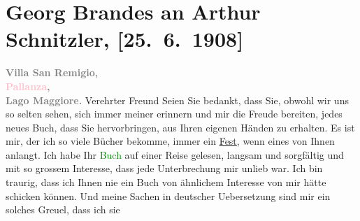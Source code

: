 

               \section[Georg Brandes an Arthur Schnitzler, {[}25. 6. 1908{]}]{ Georg Brandes an Arthur Schnitzler, {[}25. 6. 1908{]}}\nopagebreak{}\rehead{ }\normalsize\beginnumbering{} \toendnotes[C]{\smallbreak\pagebreak[2]} 
\toendnotes[C]{\smallbreak}\pstart
           \noindent{}{\pb}\textcolor{pink}{\textcolor{gray}{\textbf{Villa San Remigio}}}{}\ledrightnote{\textcolor{pink}{Villa San Remigio}}, {\\}\textcolor{gray}{\textbf{\textcolor{pink}{Pallanza}{}\ledrightnote{\textcolor{pink}{Pallanza}},}}{\\}\textcolor{gray}{\textbf{Lago Maggiore.}}\pend
           \pstart{}Verehrter Freund\pend\pstart
           Seien Sie bedankt, dass Sie, obwohl wir uns so selten sehen, sich immer meiner
                    erinnern und mir die Freude bereiten, jedes neues Buch, dass Sie hervorbringen,
                    aus Ihren eigenen Händen zu erhalten. Es ist mir, der ich so viele Bücher
                    bekomme, immer ein \uline{Fest}, wenn eines von Ihnen
                    anlangt.\pend
           \pstart
           Ich habe Ihr \textcolor{green}{Buch}{} auf einer
                    Reise gelesen, langsam und sorgfältig und mit so grossem Interesse, dass jede
                    Unterbrechung mir unlieb war.\pend
           \pstart
           {\pb}Ich bin traurig, dass ich
                    Ihnen nie ein Buch von ähnlichem Interesse von mir hätte schicken können. Und
                    meine Sachen in deutscher Uebersetzung sind mir ein solches Greuel, dass ich sie
